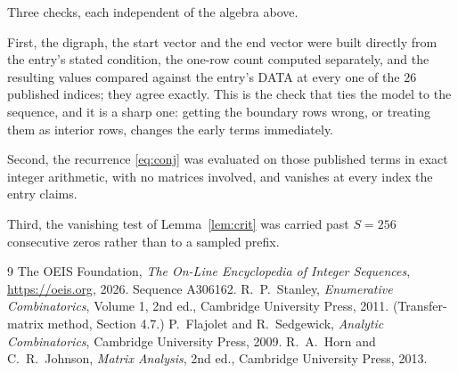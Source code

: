 \documentclass[11pt,a4paper]{article}
\theoremstyle{plain}
\theoremstyle{definition}
\begin{document}
Three checks, each independent of the algebra above.

First, the digraph, the start vector and the end vector were built directly from the
entry's stated condition, the one-row count computed separately, and the resulting values
compared against the entry's DATA at every one of the $26$ published indices; they
agree exactly. This is the check that ties the model to the sequence, and it is a sharp one:
getting the boundary rows wrong, or treating them as interior rows, changes the early terms
immediately.

Second, the recurrence \eqref{eq:conj} was evaluated on those published terms in exact
integer arithmetic, with no matrices involved, and vanishes at every index the entry claims.

Third, the vanishing test of Lemma~\ref{lem:crit} was carried past $S=256$ consecutive
zeros rather than to a sampled prefix.

\begin{thebibliography}{9}
 The OEIS Foundation, \emph{The On-Line Encyclopedia of Integer
Sequences}, \url{https://oeis.org}, 2026. Sequence A306162.
 R.~P.~Stanley, \emph{Enumerative Combinatorics}, Volume 1, 2nd ed.,
Cambridge University Press, 2011. (Transfer-matrix method, Section 4.7.)
 P.~Flajolet and R.~Sedgewick, \emph{Analytic Combinatorics}, Cambridge
University Press, 2009.
 R.~A.~Horn and C.~R.~Johnson, \emph{Matrix Analysis}, 2nd ed., Cambridge
University Press, 2013.
\end{thebibliography}
\end{document}
